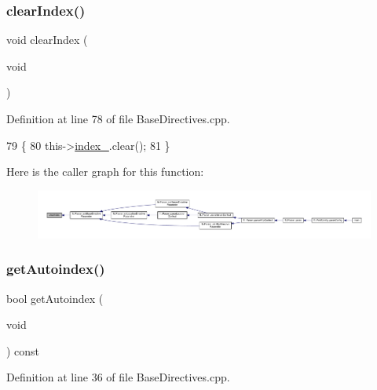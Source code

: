 \subsubsection{\texorpdfstring{clear\+Index()}{clearIndex()}}
{\footnotesize\ttfamily void clear\+Index (\begin{DoxyParamCaption}\item[{void}]{ }\end{DoxyParamCaption})\hspace{0.3cm}{\ttfamily [inherited]}}



Definition at line 78 of file Base\+Directives.\+cpp.


\begin{DoxyCode}
79     \{
80         this->\hyperlink{classft_1_1_base_directives_a6ba30626837f300201cd32c35d50aa49}{index\_}.clear();
81     \}
\end{DoxyCode}
Here is the caller graph for this function\+:
\nopagebreak
\begin{figure}[H]
\begin{center}
\leavevmode
\includegraphics[width=350pt]{classft_1_1_base_directives_a36d96dc74e650162c25a325813130ab2_icgraph}
\end{center}
\end{figure}
\mbox{\label{classft_1_1_base_directives_a4c11ed7ad76aeac228b029a2444de568}} 
\subsubsection{\texorpdfstring{get\+Autoindex()}{getAutoindex()}}
{\footnotesize\ttfamily bool get\+Autoindex (\begin{DoxyParamCaption}\item[{void}]{ }\end{DoxyParamCaption}) const\hspace{0.3cm}{\ttfamily [inherited]}}



Definition at line 36 of file Base\+Directives.\+cpp.



